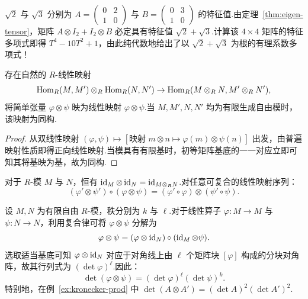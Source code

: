 \begin{example}\label{ex:poly-roots-tensor}
$\sqrt{2}$ 与 $\sqrt{3}$ 分别为 $A = \begin{pmatrix} 0 & 2 \\ 1 & 0 \end{pmatrix}$ 与 $B = \begin{pmatrix} 0 & 3 \\ 1 & 0 \end{pmatrix}$ 的特征值.由定理~\ref{thm:eigen-tensor}，矩阵 $A \otimes I_2 + I_2 \otimes B$ 必定具有特征值 $\sqrt{2} + \sqrt{3}$.计算该 $4 \times 4$ 矩阵的特征多项式即得 $T^4 - 10T^2 + 1$，由此纯代数地给出了以 $\sqrt{2} + \sqrt{3}$ 为根的有理系数多项式！
\end{example}

\begin{theorem}\label{thm:hom-tensor-hom}
存在自然的 $R$-线性映射
\[
  \operatorname{Hom}_R(M, M') \otimes_R \operatorname{Hom}_R(N, N') \to \operatorname{Hom}_R(M \otimes_R N, M' \otimes_R N'),
\]
将简单张量 $\varphi \otimes \psi$ 映为线性映射 $\varphi \otimes \psi$.当 $M, M', N, N'$ 均为有限生成自由模时，该映射为同构.
\end{theorem}

\begin{proof}
从双线性映射 $(\varphi, \psi) \mapsto [\text{映射 } m \otimes n \mapsto \varphi(m) \otimes \psi(n)]$ 出发，由普遍映射性质即得正向线性映射.当模具有有限基时，初等矩阵基底的一一对应立即可知其将基映为基，故为同构.
\end{proof}

\begin{theorem}[函子性与复合律]\label{thm:functoriality}
对于 $R$-模 $M$ 与 $N$，恒有 $\operatorname{id}_M \otimes \operatorname{id}_N = \operatorname{id}_{M \otimes_R N}$.对任意可复合的线性映射序列：
\[
  (\varphi' \otimes \psi') \circ (\varphi \otimes \psi) = (\varphi' \circ \varphi) \otimes (\psi' \circ \psi).
\]
\end{theorem}

\begin{example}[张量积行列式公式]\label{ex:det-tensor-maps}
设 $M, N$ 为有限自由 $R$-模，秩分别为 $k$ 与 $\ell$.对于线性算子 $\varphi \colon M \to M$ 与 $\psi \colon N \to N$，利用复合律可将 $\varphi \otimes \psi$ 分解为
\[
  \varphi \otimes \psi = (\varphi \otimes \operatorname{id}_N) \circ (\operatorname{id}_M \otimes \psi).
\]
选取适当基底可知 $\varphi \otimes \operatorname{id}_N$ 对应于对角线上由 $\ell$ 个矩阵块 $[\varphi]$ 构成的分块对角阵，故其行列式为 $(\det \varphi)^\ell$.因此：
\begin{equation}
  \det(\varphi \otimes \psi) = (\det \varphi)^\ell (\det \psi)^k. \label{eq:2.1}
\end{equation}
特别地，在例~\ref{ex:kronecker-prod} 中 $\det(A \otimes A') = (\det A)^2 (\det A')^2$.
\end{example}

